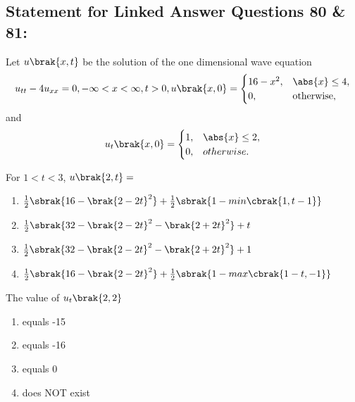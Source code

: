 \subsection*{Statement for Linked Answer Questions 80 \& 81:}
Let $u\brak{x,t}$ be the solution of the one dimensional wave equation
\begin{align*}
    u_{tt} - 4 u_{xx} = 0, -{\infty} < x < {\infty}, t>0,
    u\brak{x,0} = 
    \begin{cases}
        16-x^2, & \abs{x} \leq 4,\\
        0, & \text{otherwise},
    \end{cases}
\end{align*}
and
\begin{align*}
    u_t \brak{x,0} = 
    \begin{cases}
        1, & \abs{x} \leq 2,\\
        0, & otherwise.
    \end{cases}
\end{align*}
\item For $1 < t < 3$, $u\brak{2,t} = $
\begin{enumerate}
    \item $\frac{1}{2}\sbrak{16-\brak{2-2t}^2} + \frac{1}{2}\sbrak{1 - min\cbrak{1, t-1}}$
    \item $\frac{1}{2}\sbrak{32-\brak{2-2t}^2 - \brak{2+2t}^2} + t$
    \item $\frac{1}{2}\sbrak{32-\brak{2-2t}^2 - \brak{2+2t}^2} + 1$
    \item $\frac{1}{2}\sbrak{16-\brak{2-2t}^2} + \frac{1}{2}\sbrak{1 - max\cbrak{1-t, -1}}$
\end{enumerate}
\item The value of $u_t\brak{2,2}$
\begin{multicols}{2}
    \begin{enumerate}
        \item equals -15
        \item equals -16
        \item equals 0
        \item does NOT exist
    \end{enumerate}
\end{multicols}

